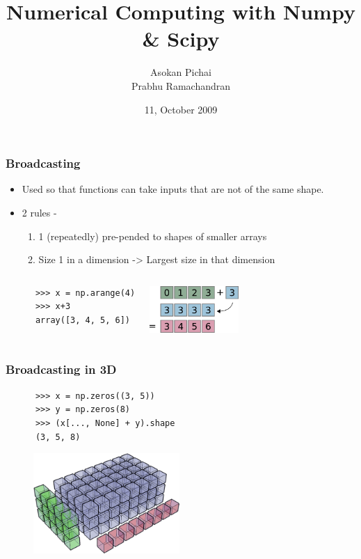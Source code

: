 \documentclass[14pt,compress]{beamer}
\title[]{Numerical Computing with Numpy \& Scipy}
\author[FOSSEE Team] {Asokan Pichai\\Prabhu Ramachandran}
\institute[IIT Bombay] {Department of Aerospace Engineering\\IIT Bombay}
\date[] {11, October 2009}
\begin{document}
\begin{frame}
  \maketitle
\end{frame}

\begin{frame}[fragile]
  \frametitle{Broadcasting}
  \begin{itemize}
    \item Used so that functions can take inputs that are not of the same shape.
    \item 2 rules -
      \begin{enumerate}
      \item 1 (repeatedly) pre-pended to shapes of smaller arrays
      \item Size 1 in a dimension -> Largest size in that dimension
      \end{enumerate}
  \end{itemize}
  \begin{columns}
    \hspace*{-1.5in}
    \begin{lstlisting}
      >>> x = np.arange(4)
      >>> x+3
      array([3, 4, 5, 6])
    \end{lstlisting}
    \includegraphics[height=0.7in, interpolate=true]{data/broadcast_scalar}
  \end{columns}
\end{frame}

\begin{frame}[fragile]
  \frametitle{Broadcasting in 3D}
    \begin{lstlisting}
      >>> x = np.zeros((3, 5))
      >>> y = np.zeros(8)
      >>> (x[..., None] + y).shape
      (3, 5, 8)
    \end{lstlisting}
    \begin{figure}
      \begin{center}
      \includegraphics[height=1.5in, interpolate=true]{data/array_3x5x8}        
      \end{center}
    \end{figure}
\end{frame}
\end{document}

